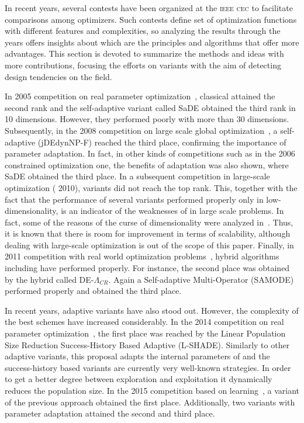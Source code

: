 In recent years, several contests have been organized at the \textsc{ieee cec} to facilitate comparisons among optimizers.
%
Such contests define set of optimization functions with different features and complexities, so analyzing the results
through the years offers insights about which are the principles and algorithms that offer more advantages.
%
This section is devoted to summarize the methods and ideas with more contributions, focusing the efforts
on \DE{} variants with the aim of detecting design tendencies on the \DE{} field. 

In \CEC{} 2005 competition on real parameter optimization~\cite{CEC2005}, classical \DE{} attained the second rank and 
the self-adaptive \DE{} variant called SaDE obtained the third rank in 10 dimensions.
%
However, they performed poorly with more than 30 dimensions.
%
Subsequently, in the 2008 competition on large scale global optimization~\cite{CEC2008}, a self-adaptive \DE{} (jDEdynNP-F) 
reached the third place, confirming the importance of parameter adaptation.
%
In fact, in other kinds of competitions such as in the 2006 constrained optimization one, the benefits of adaptation 
was also shown, where SaDE obtained the third place.
%
In a subsequent competition in large-scale optimization (\CEC{} 2010), \DE{} variants did not reach the top rank.
%
This, together with the fact that the performance of several \DE{} variants performed properly only in low-dimensionality, 
is an indicator of the weaknesses of \DE{} in large scale problems.
%
In fact, some of the reasons of the curse of dimensionality were analyzed in~\cite{segura2015improving}.
%
Thus, it is known that there is room for improvement in terms of scalability, although dealing with large-scale optimization is out of 
the scope of this paper.
%
Finally, in \CEC{} 2011 competition with real world optimization problems~\cite{CEC2011}, hybrid algorithms including \DE{} have performed
properly.
%
For instance, the second place was obtained by the hybrid \DE{} called DE-$\Lambda_{CR}$.
%
Again a Self-adaptive Multi-Operator \DE{} (SAMODE) performed properly and obtained the third place.

In recent years, adaptive variants have also stood out.
%
However, the complexity of the best schemes have increased considerably.
%
In the 2014 competition on real parameter optimization~\cite{CEC2014}, the first place was reached by the Linear Population Size 
Reduction Success-History Based Adaptive \DE{} (L-SHADE).
%
Similarly to other adaptive variants, this proposal adapts the internal parameters of \DE{} and the success-history based variants
are currently very well-known strategies.
%
In order to get a better degree between exploration and exploitation it dynamically reduces the population size.
%
In the 2015 competition based on learning~\cite{CEC2015}, a variant of the previous approach obtained the first place.
%
Additionally, two \DE{} variants with parameter adaptation attained the second and third place.

